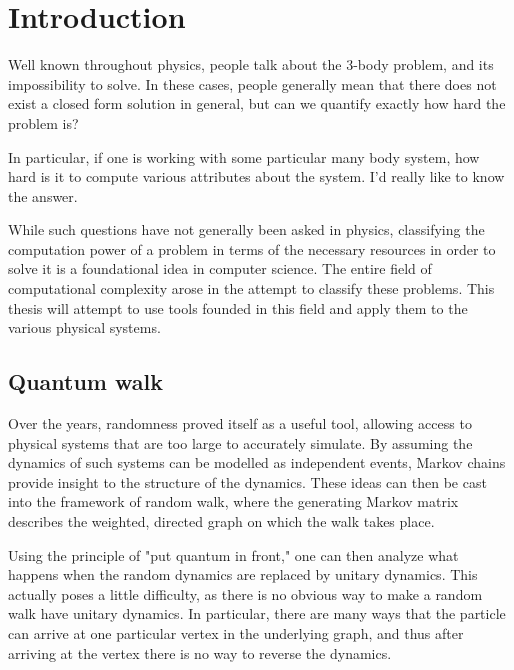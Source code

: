 \documentclass[../thesis-main/thesis-main]{subfiles}
\begin{document}
\chapter{Introduction}

Well known throughout physics, people talk about the 3-body problem, and its impossibility to solve.  In these cases, people generally mean that there does not exist a closed form solution in general, but can we quantify exactly how hard the problem is?

In particular, if one is working with some particular many body system, how hard is it to compute various attributes about the system.  I'd really like to know the answer.

While such questions have not generally been asked in physics, classifying the computation power of a problem in terms of the necessary resources in order to solve it is a foundational idea in computer science.  The entire field of computational complexity arose in the attempt to classify these problems.  This thesis will attempt to use tools founded in this field and apply them to the various physical systems.





\section{Quantum walk}
Over the years, randomness proved itself as a useful tool, allowing access to physical systems that are too large to accurately simulate.  By assuming the dynamics of such systems can be modelled as independent events, Markov chains provide insight to the structure of the dynamics.  These ideas can then be cast into the framework of random walk, where the generating Markov matrix describes the weighted, directed graph on which the walk takes place.  

Using the principle of "put quantum in front," one can then analyze what happens when the random dynamics are replaced by unitary dynamics.  This actually poses a little difficulty, as there is no obvious way to make a random walk have unitary dynamics.  In particular, there are many ways that the particle can arrive at one particular vertex in the underlying graph, and thus after arriving at the vertex there is no way to reverse the dynamics.
\end{document}

